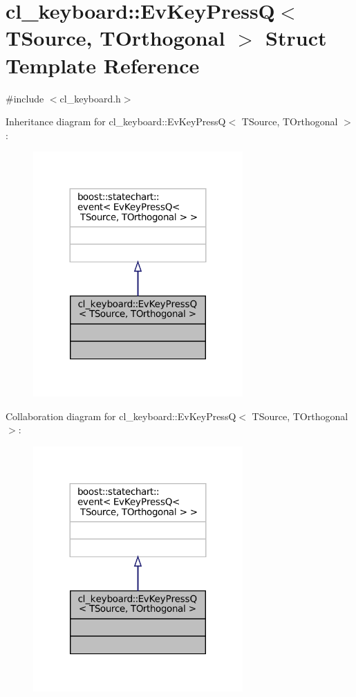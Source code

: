 \hypertarget{structcl__keyboard_1_1EvKeyPressQ}{}\section{cl\+\_\+keyboard\+:\+:Ev\+Key\+PressQ$<$ T\+Source, T\+Orthogonal $>$ Struct Template Reference}
\label{structcl__keyboard_1_1EvKeyPressQ}


{\ttfamily \#include $<$cl\+\_\+keyboard.\+h$>$}



Inheritance diagram for cl\+\_\+keyboard\+:\+:Ev\+Key\+PressQ$<$ T\+Source, T\+Orthogonal $>$\+:
\nopagebreak
\begin{figure}[H]
\begin{center}
\leavevmode
\includegraphics[width=227pt]{structcl__keyboard_1_1EvKeyPressQ__inherit__graph}
\end{center}
\end{figure}


Collaboration diagram for cl\+\_\+keyboard\+:\+:Ev\+Key\+PressQ$<$ T\+Source, T\+Orthogonal $>$\+:
\nopagebreak
\begin{figure}[H]
\begin{center}
\leavevmode
\includegraphics[width=227pt]{structcl__keyboard_1_1EvKeyPressQ__coll__graph}
\end{center}
\end{figure}


